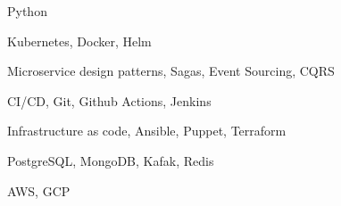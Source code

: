 \item Python
\item Kubernetes, Docker, Helm
\item Microservice design patterns, Sagas, Event Sourcing, CQRS
\item CI/CD, Git, Github Actions, Jenkins
\item Infrastructure as code, Ansible, Puppet, Terraform
\item PostgreSQL, MongoDB, Kafak, Redis
\item AWS, GCP
